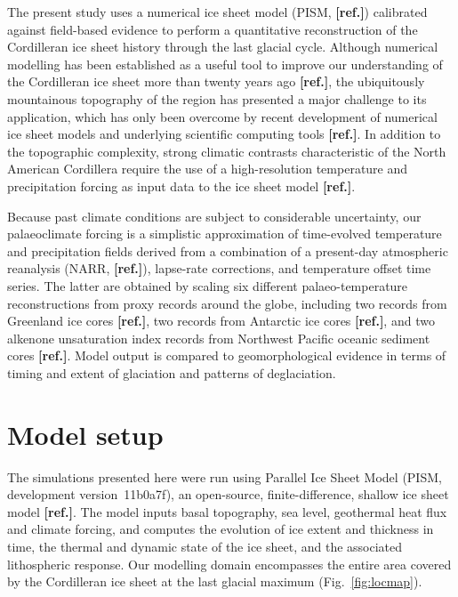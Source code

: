 \documentclass[tc, ms]{copernicus}
\newcommand{\aref}[0]{\textbf{[ref.]}}
\begin{document}
The present study uses a numerical ice sheet model (PISM, \aref) calibrated against
field-based evidence to perform a quantitative reconstruction of the
Cordilleran ice sheet history through the last glacial cycle. Although
numerical modelling has been established as a useful tool to improve our
understanding
of the Cordilleran ice sheet more than twenty years ago \aref, the ubiquitously
mountainous topography of the region has presented a major challenge to its
application, which has only been overcome by recent development of numerical ice
sheet models and underlying scientific computing tools \aref. In addition to the topographic
complexity, strong climatic contrasts characteristic of the North American
Cordillera require the use of a high-resolution temperature and precipitation
forcing as input data to the ice sheet model \aref.

Because past climate conditions are subject to considerable uncertainty, our
palaeoclimate forcing is a simplistic approximation of time-evolved temperature
and precipitation fields derived from a combination of a present-day
atmospheric reanalysis (NARR, \aref), lapse-rate corrections,
and temperature offset time series. The latter are
obtained by scaling six different palaeo-temperature reconstructions from
proxy records around the globe, including two  records from
Greenland ice cores \aref, two  records from Antarctic ice cores \aref,
and two alkenone unsaturation index records from Northwest Pacific oceanic
sediment cores \aref. Model output is compared to geomorphological evidence in terms
of timing and extent of glaciation and patterns of deglaciation.


\section{Model setup}
\label{sec:model}

The simulations presented here were run using Parallel Ice Sheet Model (PISM,
development version~11b0a7f), an open-source, finite-difference, shallow ice
sheet model \aref. The model inputs basal topography, sea level, geothermal
heat flux and climate forcing, and computes the evolution of ice extent
and thickness in time, the thermal and dynamic state of the ice sheet, and
the associated lithospheric response. Our modelling domain encompasses the
entire area covered by the Cordilleran ice sheet at the last glacial maximum
(Fig.~\ref{fig:locmap}).
\end{document}
